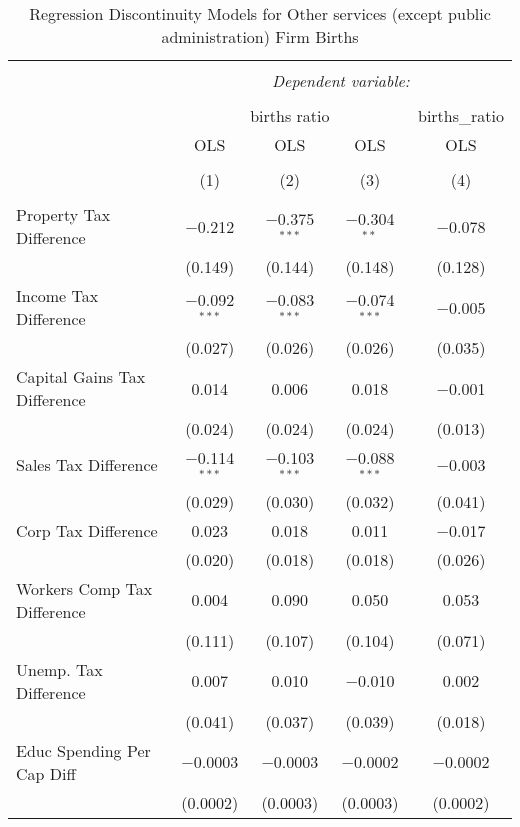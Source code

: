 
\begin{table}[!htbp] \centering 
  \caption{Regression Discontinuity Models for  Other services (except public administration) Firm Births} 
  \label{81rd} 
\begin{tabular}{@{\extracolsep{5pt}}lcccc} 
\\[-1.8ex]\hline 
\hline \\[-1.8ex] 
 & \multicolumn{4}{c}{\textit{Dependent variable:}} \\ 
\cline{2-5} 
\\[-1.8ex] & \multicolumn{3}{c}{births ratio} & births\_ratio \\ 
 & OLS & OLS & OLS & OLS \\ 
\\[-1.8ex] & (1) & (2) & (3) & (4)\\ 
\hline \\[-1.8ex] 
 Property Tax Difference & $-$0.212 & $-$0.375$^{***}$ & $-$0.304$^{**}$ & $-$0.078 \\ 
  & (0.149) & (0.144) & (0.148) & (0.128) \\ 
  Income Tax Difference & $-$0.092$^{***}$ & $-$0.083$^{***}$ & $-$0.074$^{***}$ & $-$0.005 \\ 
  & (0.027) & (0.026) & (0.026) & (0.035) \\ 
  Capital Gains Tax Difference & 0.014 & 0.006 & 0.018 & $-$0.001 \\ 
  & (0.024) & (0.024) & (0.024) & (0.013) \\ 
  Sales Tax Difference & $-$0.114$^{***}$ & $-$0.103$^{***}$ & $-$0.088$^{***}$ & $-$0.003 \\ 
  & (0.029) & (0.030) & (0.032) & (0.041) \\ 
  Corp Tax Difference & 0.023 & 0.018 & 0.011 & $-$0.017 \\ 
  & (0.020) & (0.018) & (0.018) & (0.026) \\ 
  Workers Comp Tax Difference & 0.004 & 0.090 & 0.050 & 0.053 \\ 
  & (0.111) & (0.107) & (0.104) & (0.071) \\ 
  Unemp. Tax Difference & 0.007 & 0.010 & $-$0.010 & 0.002 \\ 
  & (0.041) & (0.037) & (0.039) & (0.018) \\ 
  Educ Spending Per Cap Diff & $-$0.0003 & $-$0.0003 & $-$0.0002 & $-$0.0002 \\ 
  & (0.0002) & (0.0003) & (0.0003) & (0.0002) \\ 

\end{tabular}
\end{table}

